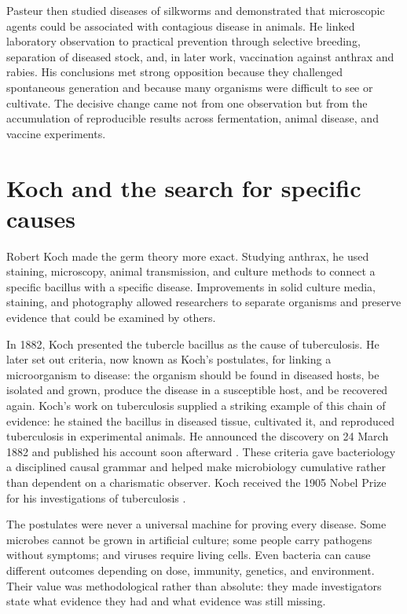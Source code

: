 \documentclass[12pt,oneside]{book}
\begin{document}
Pasteur then studied diseases of silkworms and demonstrated that microscopic
agents could be associated with contagious disease in animals. He linked
laboratory observation to practical prevention through selective breeding,
separation of diseased stock, and, in later work, vaccination against anthrax
and rabies. His conclusions met strong
opposition because they challenged spontaneous generation and because many
organisms were difficult to see or cultivate. The decisive change came not from
one observation but from the accumulation of reproducible results across
fermentation, animal disease, and vaccine experiments.

\section{Koch and the search for specific causes}
Robert Koch made the germ theory more exact. Studying anthrax, he used staining,
microscopy, animal transmission, and culture methods to connect a specific
bacillus with a specific disease. Improvements in solid culture media, staining,
and photography allowed researchers to separate organisms and preserve evidence
that could be examined by others.

In 1882, Koch presented the tubercle bacillus as the cause of tuberculosis. He
later set out criteria, now known as Koch's postulates, for linking a
microorganism to disease: the organism should be found in diseased hosts, be
isolated and grown, produce the disease in a susceptible host, and be recovered
again. Koch's work on tuberculosis supplied a striking example of this chain of
evidence: he stained the bacillus in diseased tissue, cultivated it, and
reproduced tuberculosis in experimental animals. He announced the discovery on
24 March 1882 and published his account soon afterward \cite{cdcKoch1882}.
These criteria gave bacteriology a disciplined causal grammar and helped make
microbiology cumulative rather than dependent on a charismatic observer. Koch
received the 1905 Nobel Prize for his investigations of tuberculosis
\cite{koch1905}.

The postulates were never a universal machine for proving every disease. Some
microbes cannot be grown in artificial culture; some people carry pathogens
without symptoms; and viruses require living cells. Even bacteria can cause
different outcomes depending on dose, immunity, genetics, and environment.
Their value was methodological rather than absolute: they made investigators
state what evidence they had and what evidence was still missing.
\end{document}
